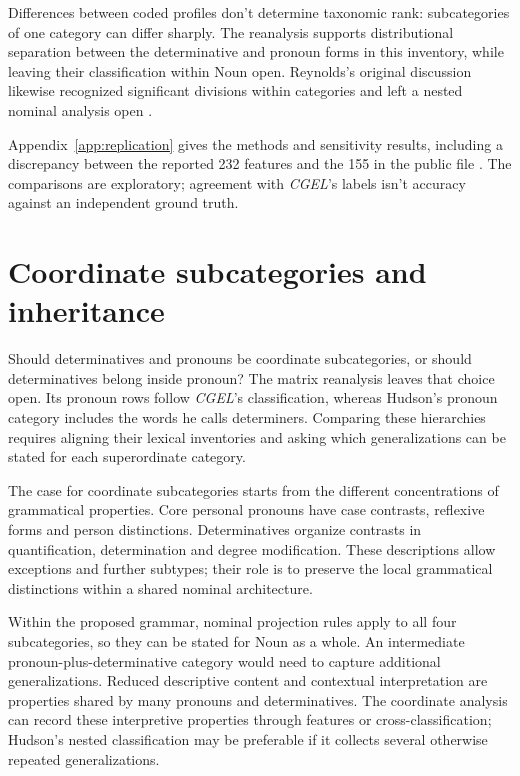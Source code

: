 \documentclass[12pt]{article}
\begin{document}
Differences between coded profiles don't determine taxonomic rank: subcategories of one category can differ sharply. The reanalysis supports distributional separation between the determinative and pronoun forms in this inventory, while leaving their classification within Noun open. Reynolds's original discussion likewise recognized significant divisions within categories and left a nested nominal analysis open \citep{reynolds2021}.

Appendix~\ref{app:replication} gives the methods and sensitivity results, including a discrepancy between the reported 232 features and the 155 in the public file \citep{reynolds2021matrixpublic}. The comparisons are exploratory; agreement with \textit{CGEL}'s labels isn't accuracy against an independent ground truth.

\section{Coordinate subcategories and inheritance}\label{sec:inheritance}

Should determinatives and pronouns be coordinate subcategories, or should determinatives belong inside pronoun? The matrix reanalysis leaves that choice open. Its pronoun rows follow \textit{CGEL}'s classification, whereas Hudson's pronoun category includes the words he calls determiners. Comparing these hierarchies requires aligning their lexical inventories and asking which generalizations can be stated for each superordinate category.

The case for coordinate subcategories starts from the different concentrations of grammatical properties. Core personal pronouns have case contrasts, reflexive forms and person distinctions. Determinatives organize contrasts in quantification, determination and degree modification. These descriptions allow exceptions and further subtypes; their role is to preserve the local grammatical distinctions within a shared nominal architecture.

Within the proposed grammar, nominal projection rules apply to all four subcategories, so they can be stated for Noun as a whole. An intermediate pronoun-plus-determinative category would need to capture additional generalizations. Reduced descriptive content and contextual interpretation are properties shared by many pronouns and determinatives. The coordinate analysis can record these interpretive properties through features or cross-classification; Hudson's nested classification may be preferable if it collects several otherwise repeated generalizations.
\end{document}
